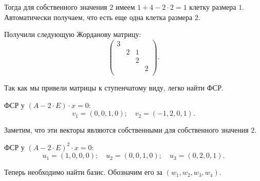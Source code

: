 \documentclass[a4paper]{article}
\begin{document}
\begin{solution}
\begin{options}
            Тогда для собственного значения $2$ имеем $1 + 4 - 2 \cdot 2 = 1$ клетку размера $1$. Автоматически получаем, что есть еще одна клетка размера $2$. 
        \end{options}

        Получили следующую Жорданову матрицу:
        \begin{equation*}
            \begin{pmatrix}
                3 & & & \\
                & 2 & 1 & \\
                & & 2 & \\
                & & & 2\\
            \end{pmatrix}.
        \end{equation*}

        Так как мы привели матрицы к ступенчатому виду, легко найти ФСР.
        \begin{options}
        \item 
            ФСР у $(A - 2 \cdot E) \cdot x = 0$:
            \begin{equation*}
                v_1 = (0, 0, 1, 0); \quad
                v_2 = (-1, 2, 0, 1).
            \end{equation*}

            Заметим, что эти векторы являются собственными для собственного значения $2$.

        \item 
            ФСР у $(A - 2 \cdot E)^2 \cdot x = 0$:
            \begin{equation*}
                u_1 = (1, 0, 0, 0); \quad
                u_2 = (0, 0, 1, 0); \quad
                u_3 = (0, 2, 0, 1).
            \end{equation*}
        \end{options}

        Теперь необходимо найти базис. Обозначим его за $(w_1, w_2, w_3, w_4)$.


\end{solution}
\end{document}
